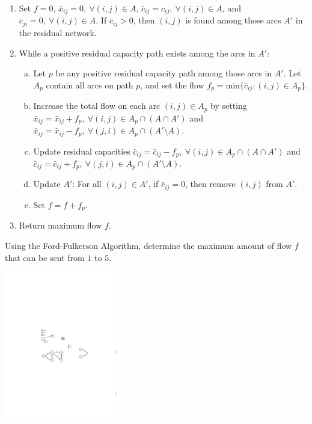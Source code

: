 \documentclass[12pt]{article}
\theoremstyle{definition}
\begin{document}
\begin{enumerate}
	\item Set $f = 0$, $\bar{x}_{ij} = 0, \ \forall (i,j) \in A$, $\bar{c}_{ij} = c_{ij}, \ \forall (i,j) \in A$, and $\bar{c}_{ji} = 0, \ \forall (i,j) \in A$. If $\bar{c}_{ij} > 0$, then $(i,j)$ is found among those arcs $A'$ in the residual network.
	\item While a positive residual capacity path exists among the arcs in $A'$:
	\begin{enumerate}[a.]
		\item Let $p$ be any positive residual capacity path among those arcs in $A'$. Let $A_p$ contain all arcs on path $p$, and set the flow $f_p = \textrm{min}\{\bar{c}_{ij}: (i,j) \in A_p \}$.
		\item Increase the total flow on each arc $(i,j) \in A_p$ by setting $\bar{x}_{ij} = \bar{x}_{ij} + f_p, \ \forall (i,j) \in A_p \cap (A \cap A')$ and $\bar{x}_{ij} = \bar{x}_{ij} - f_p, \ \forall (j,i) \in A_p \cap (A' \setminus A)$. 
		\item Update residual capacities $\bar{c}_{ij} = \bar{c}_{ij} - f_p, \ \forall (i,j) \in A_p \cap (A \cap A')$ and $\bar{c}_{ij} = \bar{c}_{ij} + f_p, \ \forall (j,i) \in A_p \cap (A' \setminus A)$. 
		\item Update $A'$: For all $(i,j) \in A'$, if $\bar{c}_{ij} = 0$, then remove $(i,j)$ from $A'$.
		\item Set $f = f + f_p$.
	\end{enumerate}		
	\item Return maximum flow $f$. \label{final_step}

\end{enumerate}


\newpage 

Using the Ford-Fulkerson Algorithm, determine the maximum amount of flow $f$ that can be sent from $1$ to $5$.
\begin{center}
\includegraphics[width=5cm]{shortestpathexample1}
\end{center}
\vfill
\end{document}
